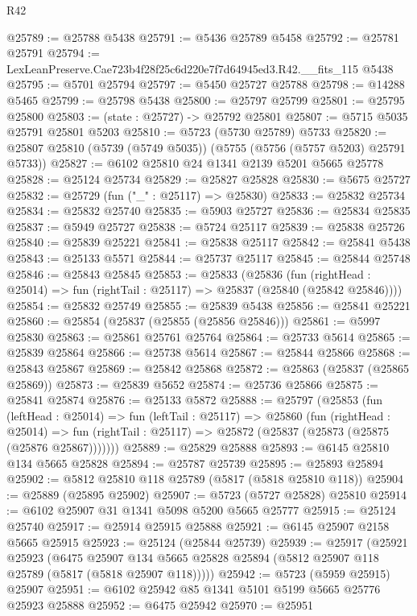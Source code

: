 \begin{lexlean}{R42}
\begin{coremodule}
@25789 := @25788 @5438
@25791 := @5436 @25789 @5458
@25792 := @25781 @25791
@25794 := LexLeanPreserve.Cae723b4f28f25c6d220e7f7d64945ed3.R42.__fits_115 @5438
@25795 := @5701 @25794
@25797 := @5450 @25727 @25788
@25798 := @14288 @5465
@25799 := @25798 @5438
@25800 := @25797 @25799
@25801 := @25795 @25800
@25803 := (state : @25727) -> @25792 @25801
@25807 := @5715 @5035 @25791 @25801 @5203
@25810 := @5723 (@5730 @25789) @5733
@25820 := @25807 @25810 (@5739 (@5749 @5035)) (@5755 (@5756 (@5757 @5203) @25791 @5733))
@25827 := @6102 @25810 @24 @1341 @2139 @5201 @5665 @25778
@25828 := @25124 @25734
@25829 := @25827 @25828
@25830 := @5675 @25727
@25832 := @25729 (fun ("_" : @25117) => @25830)
@25833 := @25832 @25734
@25834 := @25832 @25740
@25835 := @5903 @25727
@25836 := @25834 @25835
@25837 := @5949 @25727
@25838 := @5724 @25117
@25839 := @25838 @25726
@25840 := @25839 @25221
@25841 := @25838 @25117
@25842 := @25841 @5438
@25843 := @25133 @5571
@25844 := @25737 @25117
@25845 := @25844 @25748
@25846 := @25843 @25845
@25853 := @25833
    (@25836
      (fun (rightHead : @25014) => fun (rightTail : @25117) => @25837 (@25840 (@25842 @25846))))
@25854 := @25832 @25749
@25855 := @25839 @5438
@25856 := @25841 @25221
@25860 := @25854 (@25837 (@25855 (@25856 @25846)))
@25861 := @5997 @25830
@25863 := @25861 @25761 @25764
@25864 := @25733 @5614
@25865 := @25839 @25864
@25866 := @25738 @5614
@25867 := @25844 @25866
@25868 := @25843 @25867
@25869 := @25842 @25868
@25872 := @25863 (@25837 (@25865 @25869))
@25873 := @25839 @5652
@25874 := @25736 @25866
@25875 := @25841 @25874
@25876 := @25133 @5872
@25888 := @25797
    (@25853
      (fun (leftHead : @25014) =>
      fun (leftTail : @25117) =>
      @25860
        (fun (rightHead : @25014) =>
        fun (rightTail : @25117) => @25872 (@25837 (@25873 (@25875 (@25876 @25867)))))))
@25889 := @25829 @25888
@25893 := @6145 @25810 @134 @5665 @25828
@25894 := @25787 @25739
@25895 := @25893 @25894
@25902 := @5812 @25810 @118 @25789 (@5817 (@5818 @25810 @118))
@25904 := @25889 (@25895 @25902)
@25907 := @5723 (@5727 @25828) @25810
@25914 := @6102 @25907 @31 @1341 @5098 @5200 @5665 @25777
@25915 := @25124 @25740
@25917 := @25914 @25915 @25888
@25921 := @6145 @25907 @2158 @5665 @25915
@25923 := @25124 (@25844 @25739)
@25939 := @25917
    (@25921
      @25923
      (@6475
        @25907
        @134
        @5665
        @25828
        @25894
        (@5812 @25907 @118 @25789 (@5817 (@5818 @25907 @118)))))
@25942 := @5723 (@5959 @25915) @25907
@25951 := @6102 @25942 @85 @1341 @5101 @5199 @5665 @25776 @25923 @25888
@25952 := @6475 @25942
@25970 := @25951

\end{coremodule}
\end{lexlean}
